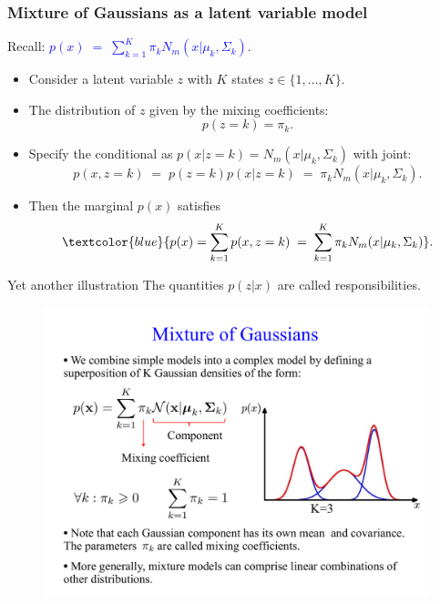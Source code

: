\documentclass[11pt,handout,aspectratio=169]{beamer}
\begin{document}
\begin{frame}
\frametitle{Mixture of Gaussians as a latent variable model}
Recall: \textcolor{blue}{$p(x)\;=\;\sum_{k=1}^K \pi_k N_m(x|\mu_k,\Sigma_k)$}.\\[.3cm]
\begin{itemize}
	\item Consider a latent variable $z$ with $K$ states $z\in \{1,\ldots,K\}$. 
	\item The distribution of $z$ given by the mixing coefficients: $$p(z=k)=\pi_k.$$
	\item Specify the conditional as $p(x|z=k)=N_m(x|\mu_k,\Sigma_k)$ with joint: $$p(x,z=k)\;=\;p(z=k)p(x|z=k)\;=\;\pi_k N_m(x|\mu_k,\Sigma_k).$$
	\item Then the marginal $p(x)$ satisfies $$\textcolor{blue}{p(x)=\sum_{k=1}^K p(x,z=k)\;=\;\sum_{k=1}^K \pi_k N_m(x|\mu_k,\Sigma_k)}.$$
\end{itemize}
\end{frame}

\begin{frame}{Yet another illustration}
The quantities $p(z|x)$ are called responsibilities.
\begin{figure}
\includegraphics[page=8,width=4.8in,trim={0 0 0 3cm},clip]{pics/raw.pdf}
\end{figure}
\end{frame}
\end{document}
